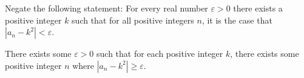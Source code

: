 \documentclass[11pt]{article}
\begin{document}
\makeAssignmentTitle

\begin{homeworkProblem}
    Negate the following statement: For every real number $\varepsilon > 0$ there exists a positive integer $k$
    such that for all positive integers $n$, it is the case that $|a_n - k^2| < \varepsilon$. \vspace{1\baselineskip}

    \solution

    There exists some $\varepsilon > 0$ such that for each positive integer $k$, there exists some positive integer $n$ where $| a_n - k^2 | \geq \varepsilon$.

\end{homeworkProblem}

\pagebreak
\end{document}
